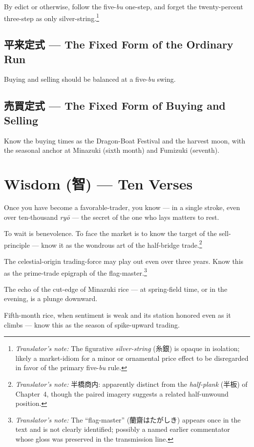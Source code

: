 \documentclass[10pt, openany]{book}
\newcommand{\jp}[1]{{\japanesefont #1}}
\newcommand{\tn}[1]{\footnote{\textit{Translator's note:} #1}}
\begin{document}
By edict or otherwise, follow the five-\textit{bu} one-step, and
forget the twenty-percent three-step as only silver-string.\tn{The
figurative \textit{silver-string} (\jp{糸銀}) is opaque in
isolation; likely a market-idiom for a minor or ornamental price
effect to be disregarded in favor of the primary five-\textit{bu}
rule.}

\subsection*{\jp{平来定式} --- The Fixed Form of the Ordinary Run}

Buying and selling should be balanced at a five-\textit{bu} swing.

\subsection*{\jp{売買定式} --- The Fixed Form of Buying and Selling}

Know the buying times as the Dragon-Boat Festival and the harvest
moon, with the seasonal anchor at Minazuki (sixth month) and
Fumizuki (seventh).

\section{Wisdom (\jp{智}) --- Ten Verses}

Once you have become a favorable-trader, you know --- in a single
stroke, even over ten-thousand \textit{ry\=o} --- the secret of
the one who lays matters to rest.

To wait is benevolence. To face the market is to know the target
of the sell-principle --- know it as the wondrous art of the
half-bridge trade.\tn{\jp{半橋商内}: apparently distinct from
the \textit{half-plank} (\jp{半板}) of Chapter~4, though the
paired imagery suggests a related half-unwound position.}

The celestial-origin trading-force may play out even over three
years. Know this as the prime-trade epigraph of the flag-master.\tn{%
The ``flag-master'' (\jp{蘭齋はたがしき}) appears once in the text
and is not clearly identified; possibly a named earlier commentator
whose gloss was preserved in the transmission line.}

The echo of the cut-edge of Minazuki rice --- at spring-field
time, or in the evening, is a plunge downward.

Fifth-month rice, when sentiment is weak and its station honored
even as it climbs --- know this as the season of spike-upward
trading.
\end{document}
